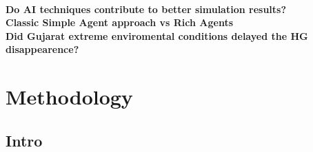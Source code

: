 \documentclass{report}
\begin{document}
\\

\indent \textbf{Do AI techniques contribute to better simulation results?}\\
\indent \textbf{Classic Simple Agent approach vs Rich Agents}\\
\indent \textbf{Did Gujarat extreme enviromental conditions delayed the HG disappearence?}\\
\newpage 
\chapter{Methodology}




\section{Intro}

\\
\\
\end{document}
